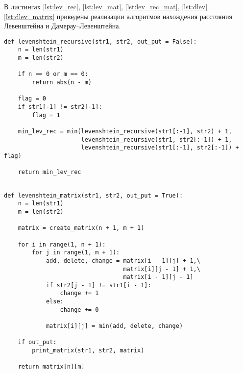 В листингах \ref{lst:lev_rec}, \ref{lst:lev_mat}, \ref{lst:lev_rec_mat}, \ref{lst:dlev} \ref{lst:dlev_matrix} приведены реализации алгоритмов нахождения расстояния Левенштейна и Дамерау--Левенштейна.

\begin{lstlisting}[label=lst:lev_rec,caption=Функция нахождения расстояния Левенштейна с использованием рекурсии.]
def levenshtein_recursive(str1, str2, out_put = False):
	n = len(str1)
	m = len(str2)
	
	if n == 0 or m == 0:
		return abs(n - m)
	
	flag = 0
	if str1[-1] != str2[-1]:
		flag = 1
	
	min_lev_rec = min(levenshtein_recursive(str1[:-1], str2) + 1,
					  levenshtein_recursive(str1, str2[:-1]) + 1,
					  levenshtein_recursive(str1[:-1], str2[:-1]) + flag)
	
	return min_lev_rec
	
\end{lstlisting}

\begin{lstlisting}[label=lst:lev_mat,caption=Функция нахождения расстояния Левенштейна с использованием рекурсии.]
def levenshtein_matrix(str1, str2, out_put = True):
	n = len(str1)
	m = len(str2)
	
	matrix = create_matrix(n + 1, m + 1)
	
	for i in range(1, n + 1):
		for j in range(1, m + 1):
			add, delete, change = matrix[i - 1][j] + 1,\
								  matrix[i][j - 1] + 1,\
						    	  matrix[i - 1][j - 1]
			if str2[j - 1] != str1[i - 1]:
				change += 1
			else:
				change += 0
			
			matrix[i][j] = min(add, delete, change)
	
	if out_put:
		print_matrix(str1, str2, matrix)
	
	return matrix[n][m]
	
\end{lstlisting}

